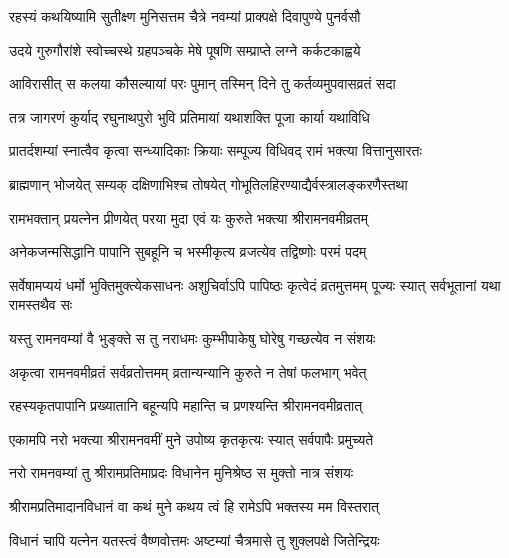 \twolineshloka
{रहस्यं कथयिष्यामि सुतीक्ष्ण मुनिसत्तम}
{चैत्रे नवम्यां प्राक्पक्षे दिवापुण्ये पुनर्वसौ}%

\twolineshloka
{उदये गुरुगौरांशे स्वोच्चस्थे ग्रहपञ्चके}
{मेषे पूषणि सम्प्राप्ते लग्ने कर्कटकाह्वये}%

\twolineshloka
{आविरासीत् स कलया कौसल्यायां परः पुमान्}
{तस्मिन् दिने तु कर्तव्यमुपवासव्रतं सदा}%

\twolineshloka
{तत्र जागरणं कुर्याद् रघुनाथपुरो भुवि}%
{प्रतिमायां यथाशक्ति पूजा कार्या यथाविधि}%

\twolineshloka
{प्रातर्दशम्यां स्नात्वैव कृत्वा सन्ध्यादिकाः क्रियाः}
{सम्पूज्य विधिवद् रामं भक्त्या वित्तानुसारतः}%

\twolineshloka
{ब्राह्मणान् भोजयेत् सम्यक् दक्षिणाभिश्च तोषयेत्}
{गोभूतिलहिरण्याद्यैर्वस्त्रालङ्करणैस्तथा}%

\twolineshloka
{रामभक्तान् प्रयत्नेन प्रीणयेत् परया मुदा}
{एवं यः कुरुते भक्त्या श्रीरामनवमीव्रतम्}%

\twolineshloka
{अनेकजन्मसिद्धानि पापानि सुबहूनि च}
{भस्मीकृत्य व्रजत्येव तद्विष्णोः परमं पदम्}%

\threelineshloka
{सर्वेषामप्ययं धर्मो भुक्तिमुक्त्येकसाधनः}
{अशुचिर्वाऽपि पापिष्ठः कृत्वेदं व्रतमुत्तमम्}
{पूज्यः स्यात् सर्वभूतानां यथा रामस्तथैव सः}%

\twolineshloka
{यस्तु रामनवम्यां वै भुङ्क्ते स तु नराधमः}
{कुम्भीपाकेषु घोरेषु गच्छत्येव न संशयः}%

\twolineshloka
{अकृत्वा रामनवमीव्रतं सर्वव्रतोत्तमम्}
{व्रतान्यन्यानि कुरुते न तेषां फलभाग् भवेत्}%

\twolineshloka
{रहस्यकृतपापानि प्रख्यातानि बहून्यपि}
{महान्ति च प्रणश्यन्ति श्रीरामनवमीव्रतात्}%

\twolineshloka
{एकामपि नरो भक्त्या श्रीरामनवमीं मुने}
{उपोष्य कृतकृत्यः स्यात् सर्वपापैः प्रमुच्यते}%

\twolineshloka
{नरो रामनवम्यां तु श्रीरामप्रतिमाप्रदः}
{विधानेन मुनिश्रेष्ठ स मुक्तो नात्र संशयः}%

\twolineshloka
{श्रीरामप्रतिमादानविधानं वा कथं मुने}
{कथय त्वं हि रामेऽपि भक्तस्य मम विस्तरात्}%


\twolineshloka
{विधानं चापि यत्नेन यतस्त्वं वैष्णवोत्तमः}
{अष्टम्यां चैत्रमासे तु शुक्लपक्षे जितेन्द्रियः}%

